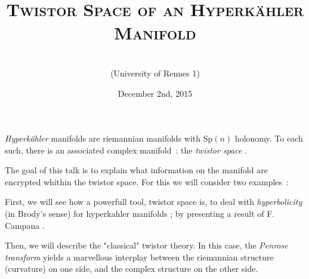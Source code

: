 \documentclass[11pt,draft,makeidx]{article}
\title{\textsc{Twistor Space of an Hyperkähler Manifold}}
\date{December 2nd, 2015}
\author{\name{Basile}{Pillet}\\ {\small (University of Rennes 1)}}
\begin{document}
\maketitle
\textit{Hyperkähler} manifolds are riemannian manifolds with $\text{Sp}(n)$ holonomy. To each such, there is an associated complex manifold~: the \textit{twistor space} \cite{HKLR}.

The goal of this talk is to explain what information on the manifold are encrypted whithin the twistor space. For this we will consider two examples~:

First, we will see how a powerfull tool, twistor space is, to deal with \textit{hyperbolicity} (in Brody's sense) for hyperkahler manifolds ; by presenting a result of F. Campana \cite{Campana}.

Then, we will describe the "classical" twistor theory. In this case, the \textit{Penrose transform} yields a marvellous interplay between the riemannian structure (curvature) on one side, and the complex structure on the other side.


\vfill



\end{document}
